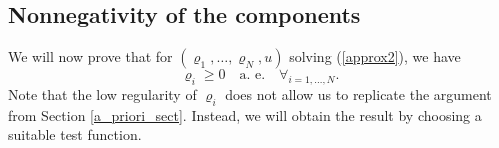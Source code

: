 \documentclass[11pt]{article}
\newcommand{\dd}{\mathrm{d}}
\numberwithin{equation}{section}
\numberwithin{tw}{section}
\begin{document}
\subsection{Nonnegativity of the components}
We will now prove that for $(\varrho_1,\dots,\varrho_N,u)$ solving (\ref{approx2}), we have
\[ \varrho_i \geq 0 \quad \text{a. e.} \quad \forall_{i=1,\dots,N}. \]
Note that the low regularity of $\varrho_i$ does not allow us to replicate the argument from Section \ref{a_priori_sect}. Instead, we will obtain the result by choosing a suitable test function. 
\end{document}
